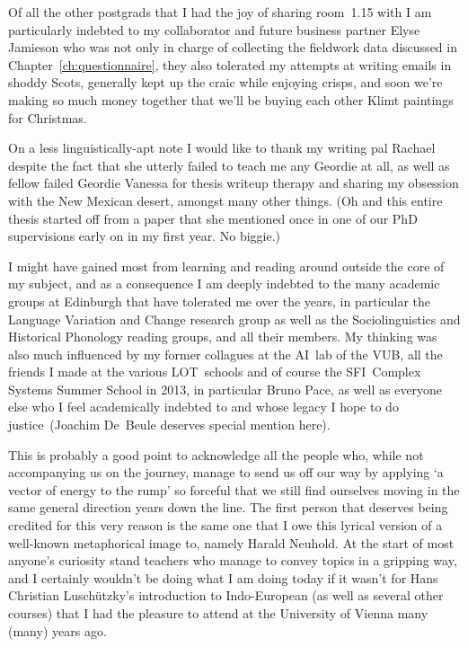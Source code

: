 \documentclass[twoside,10pt]{book}
\begin{document}
Of all the other postgrads that I had the joy of sharing room~1.15 with I am particularly indebted to my collaborator and future business partner Elyse Jamieson who was not only in charge of collecting the fieldwork data discussed in Chapter~\ref{ch:questionnaire}, they also tolerated my attempts at writing emails in shoddy Scots, generally kept up the craic while enjoying crisps, and soon we're making so much money together that we'll be buying each other Klimt paintings for Christmas.

On a less linguistically-apt note I would like to thank my writing pal Rachael despite the fact that she utterly failed to teach me any Geordie at all, as well as fellow failed Geordie Vanessa for thesis writeup therapy and sharing my obsession with the New Mexican desert, amongst many other things. (Oh and this entire thesis started off from a paper that she mentioned once in one of our PhD supervisions early on in my first year. No biggie.)

I might have gained most from learning and reading around outside the core of my subject, and as a consequence I am deeply indebted to the many academic groups at Edinburgh that have tolerated me over the years, in particular the Language Variation and Change research group as well as the Sociolinguistics and Historical Phonology reading groups, and all their members. My thinking was also much influenced by my former collagues at the AI~lab of the VUB, all the friends I made at the various LOT~schools and of course the SFI~Complex Systems Summer School in 2013, in particular Bruno Pace, as well as everyone else who I feel academically indebted to and whose legacy I hope to do justice~(Joachim De~Beule deserves special mention here).

This is probably a good point to acknowledge all the people who, while not accompanying us on the journey, manage to send us off our way by applying `a vector of energy to the rump' so forceful that we still find ourselves moving in the same general direction years down the line.
The first person that deserves being credited for this very reason is the same one that I owe this lyrical version of a well-known metaphorical image to, namely Harald Neuhold. At the start of most anyone's curiosity stand teachers who manage to convey topics in a gripping way, and I certainly wouldn't be doing what I am doing today if it wasn't for Hans Christian Luschützky's introduction to Indo-European (as well as several other courses) that I had the pleasure to attend at the University of Vienna many (many) years ago.
\end{document}
